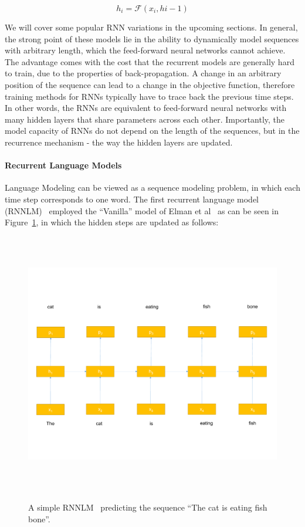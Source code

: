 
\begin{equation}
h_i = \mathcal{F}(x_i, h{i-1})
\end{equation}

 We will cover some popular RNN variations in the upcoming sections. In general, the strong point of these models lie in the ability to dynamically model sequences with arbitrary length, which the feed-forward neural networks cannot achieve. The advantage comes with the cost that the recurrent models are generally hard to train, due to the properties of back-propagation. A change in an arbitrary position of the sequence can lead to a change in the objective function, therefore training methods for RNNs typically have to trace back the previous time steps. In other words, the RNNs are equivalent to feed-forward neural networks with many hidden layers that share parameters across each other. Importantly, the model capacity of RNNs do not depend on the length of the sequences, but in the recurrence mechanism - the way the hidden layers are updated. 
 
\paragraph{Recurrent Language Models} Language Modeling can be viewed as a sequence modeling problem, in which each time step corresponds to one word. The first recurrent language model (RNNLM)~\cite{mikolov2010recurrent} employed the ``Vanilla'' model of Elman et al~\cite{elman1990finding} as can be seen in Figure~\ref{fig:SimpleRNN}, in which the hidden steps are updated as follows:

~ \begin{figure}[!t]
	~ \centering
	~ \includegraphics[width=\columnwidth]{figures/rnn.pdf}
	~ \caption{A simple RNNLM~\cite{mikolov2010recurrent} predicting the sequence ``The cat is eating fish bone''.}  
	~ \label{fig:SimpleRNN}
	~ \end{figure}



